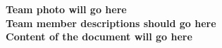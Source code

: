 \documentclass[11pt,pressrelease]{newlfm} %
\begin{document}
\begin{newlfm}



\textbf{Team photo will go here}
\\
\textbf{Team member descriptions should go here}
\\
\textbf{Content of the document will go here}



\end{newlfm}
\end{document}
